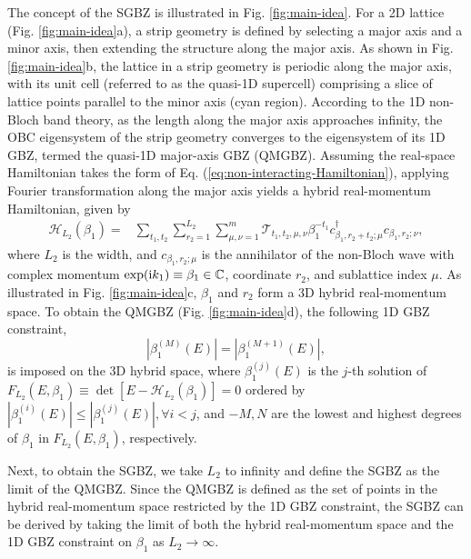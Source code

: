 The concept of the SGBZ is illustrated in Fig. \ref{fig:main-idea}.
For a 2D lattice (Fig. \ref{fig:main-idea}a), a strip geometry is
defined by selecting a major axis and a minor axis, then extending
the structure along the major axis. As shown in Fig. \ref{fig:main-idea}b,
the lattice in a strip geometry is periodic along the major axis,
with its unit cell (referred to as the quasi-1D supercell) comprising
a slice of lattice points parallel to the minor axis (cyan region).
According to the 1D non-Bloch band theory, as the length along the
major axis approaches infinity, the OBC eigensystem of the strip geometry
converges to the eigensystem of its 1D GBZ, termed the quasi-1D major-axis
GBZ (QMGBZ). Assuming the real-space Hamiltonian takes the form of
Eq. (\ref{eq:non-interacting-Hamiltonian}), applying Fourier transformation
along the major axis yields a hybrid real-momentum Hamiltonian, given
by 
\begin{align}
\mathcal{H}_{L_{2}}\left(\beta_{1}\right)= & \sum_{t_{1},t_{2}}\sum_{r_{2}=1}^{L_{2}}\sum_{\mu,\nu=1}^{m}\mathcal{T}_{t_{1},t_{2},\mu,\nu}\beta_{1}^{-t_{1}}c_{\beta_{1},r_{2}+t_{2};\mu}^{\dagger}c_{\beta_{1},r_{2};\nu},\label{eq:hybrid-non-Bloch-Hamiltonian}
\end{align}
where $L_{2}$ is the width, and $c_{\beta_{1},r_{2};\mu}$ is the
annihilator of the non-Bloch wave with complex momentum $\exp(\mathrm{i} k_{1})\equiv\beta_{1}\in\mathbb{C}$,
coordinate $r_{2}$, and sublattice index $\mu$. As illustrated in
Fig. \ref{fig:main-idea}c, $\beta_{1}$ and $r_{2}$ form a 3D hybrid
real-momentum space. To obtain the QMGBZ (Fig. \ref{fig:main-idea}d),
the following 1D GBZ constraint, 
\begin{equation}
|\beta_{1}^{(M)}(E)|=|\beta_{1}^{(M+1)}(E)|,\label{eq:quasi-1D-GBZ-constraint}
\end{equation}
is imposed on the 3D hybrid space, where $\beta_{1}^{(j)}(E)$ is
the $j$-th solution of $F_{L_{2}}(E,\beta_{1})\equiv\det[E-\mathcal{H}_{L_{2}}(\beta_{1})]=0$
ordered by $|\beta_{1}^{(i)}(E)|\leq|\beta_{1}^{(j)}(E)|,\forall i<j$,
and $-M,N$ are the lowest and highest degrees of $\beta_{1}$ in
$F_{L_{2}}(E,\beta_{1})$, respectively.

Next, to obtain the SGBZ, we take $L_{2}$ to infinity and define
the SGBZ as the limit of the QMGBZ. Since the QMGBZ is defined as
the set of points in the hybrid real-momentum space restricted by
the 1D GBZ constraint, the SGBZ can be derived by taking the limit
of both the hybrid real-momentum space and the 1D GBZ constraint on
$\beta_{1}$ as $L_{2}\rightarrow\infty$.

